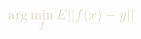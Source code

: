 \documentclass[10pt]{article}
\begin{document}
\begin{align*}{\color[rgb]{0.87,0.84,0.76} \arg \min_f  E || f(x) - y || }\end{align*}
\end{document}
